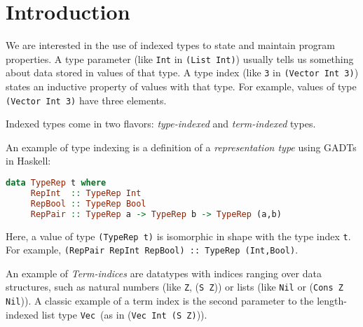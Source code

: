 \section{Introduction}


We are interested in the use of indexed types to state and
maintain program properties. A type parameter
(like {\tt Int} in {\tt (List Int)}) usually tells us
something about data stored in values of that type.
A type index (like {\tt 3} in {\tt (Vector Int 3)}) states
an inductive property of values with that type. For example,
values of type {\tt (Vector Int 3)} have three elements.

Indexed types come in two flavors: \emph{type-indexed} and \emph{term-indexed}
types. 


An example of type indexing is a definition of a \emph{representation type}
\cite{crary98intensional} using GADTs in Haskell:\vspace*{-2pt}
\begin{lstlisting}[basicstyle={\ttfamily\small},language=Haskell,mathescape]
   data TypeRep t where
     RepInt  :: TypeRep Int
     RepBool :: TypeRep Bool
     RepPair :: TypeRep a -> TypeRep b -> TypeRep (a,b)
\end{lstlisting}\vspace*{-2pt}
Here, a value of type {\tt\small (TypeRep t)} is isomorphic in shape with
the type index {\tt t}. For example,
{\tt (RepPair RepInt RepBool) :: TypeRep (Int,Bool)}.


An example of {\it Term-indices} are datatypes with
indices ranging over data structures, such as natural numbers
(like {\tt Z}, {(\tt S Z})) or lists (like {\tt Nil} or ({\tt Cons Z Nil})). 
A classic example of a term index is the second parameter to
the length-indexed list type {\tt Vec}~(as in ({\tt Vec Int (S Z)})).


